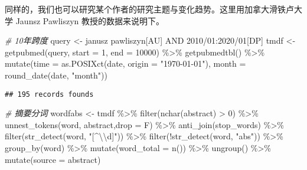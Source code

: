 \documentclass[]{tufte-book}
\newenvironment{Shaded}{}{}
\newcommand{\AttributeTok}[1]{\textcolor[rgb]{0.49,0.56,0.16}{#1}}
\newcommand{\CommentTok}[1]{\textcolor[rgb]{0.38,0.63,0.69}{\textit{#1}}}
\newcommand{\DecValTok}[1]{\textcolor[rgb]{0.25,0.63,0.44}{#1}}
\newcommand{\FunctionTok}[1]{\textcolor[rgb]{0.02,0.16,0.49}{#1}}
\newcommand{\NormalTok}[1]{#1}
\newcommand{\OtherTok}[1]{\textcolor[rgb]{0.00,0.44,0.13}{#1}}
\newcommand{\SpecialCharTok}[1]{\textcolor[rgb]{0.25,0.44,0.63}{#1}}
\newcommand{\StringTok}[1]{\textcolor[rgb]{0.25,0.44,0.63}{#1}}
\begin{document}
同样的，我们也可以研究某个作者的研究主题与变化趋势。这里用加拿大滑铁卢大学 Jaunsz Pawliszyn 教授的数据来说明下。

\begin{Shaded}
\begin{Highlighting}[]
\CommentTok{\# 10年跨度}
\NormalTok{query }\OtherTok{\textless{}{-}} \StringTok{\textquotesingle{}janusz pawliszyn[AU] AND 2010/01:2020/01[DP]\textquotesingle{}}
\NormalTok{tmdf }\OtherTok{\textless{}{-}} \FunctionTok{getpubmed}\NormalTok{(query, }\AttributeTok{start =} \DecValTok{1}\NormalTok{, }\AttributeTok{end =} \DecValTok{10000}\NormalTok{) }\SpecialCharTok{\%\textgreater{}\%}
        \FunctionTok{getpubmedtbl}\NormalTok{() }\SpecialCharTok{\%\textgreater{}\%}
        \FunctionTok{mutate}\NormalTok{(}\AttributeTok{time =} \FunctionTok{as.POSIXct}\NormalTok{(date, }\AttributeTok{origin =} \StringTok{"1970{-}01{-}01"}\NormalTok{),}
         \AttributeTok{month =} \FunctionTok{round\_date}\NormalTok{(date, }\StringTok{"month"}\NormalTok{))}
\end{Highlighting}
\end{Shaded}

\begin{verbatim}
## 195 records founds
\end{verbatim}

\begin{Shaded}
\begin{Highlighting}[]
\CommentTok{\# 摘要分词}
\NormalTok{wordfabs }\OtherTok{\textless{}{-}}\NormalTok{ tmdf }\SpecialCharTok{\%\textgreater{}\%}
        \FunctionTok{filter}\NormalTok{(}\FunctionTok{nchar}\NormalTok{(abstract) }\SpecialCharTok{\textgreater{}} \DecValTok{0}\NormalTok{) }\SpecialCharTok{\%\textgreater{}\%}
        \FunctionTok{unnest\_tokens}\NormalTok{(word, abstract,}\AttributeTok{drop =}\NormalTok{ F) }\SpecialCharTok{\%\textgreater{}\%}
        \FunctionTok{anti\_join}\NormalTok{(stop\_words) }\SpecialCharTok{\%\textgreater{}\%}
        \FunctionTok{filter}\NormalTok{(}\FunctionTok{str\_detect}\NormalTok{(word, }\StringTok{"[\^{}}\SpecialCharTok{\textbackslash{}\textbackslash{}}\StringTok{d]"}\NormalTok{)) }\SpecialCharTok{\%\textgreater{}\%}
        \FunctionTok{filter}\NormalTok{(}\SpecialCharTok{!}\FunctionTok{str\_detect}\NormalTok{(word, }\StringTok{"abs"}\NormalTok{)) }\SpecialCharTok{\%\textgreater{}\%}
        \FunctionTok{group\_by}\NormalTok{(word) }\SpecialCharTok{\%\textgreater{}\%}
        \FunctionTok{mutate}\NormalTok{(}\AttributeTok{word\_total =} \FunctionTok{n}\NormalTok{()) }\SpecialCharTok{\%\textgreater{}\%}
        \FunctionTok{ungroup}\NormalTok{() }\SpecialCharTok{\%\textgreater{}\%}
        \FunctionTok{mutate}\NormalTok{(}\AttributeTok{source =} \StringTok{\textquotesingle{}abstract\textquotesingle{}}\NormalTok{)}
\end{Highlighting}
\end{Shaded}
\end{document}
